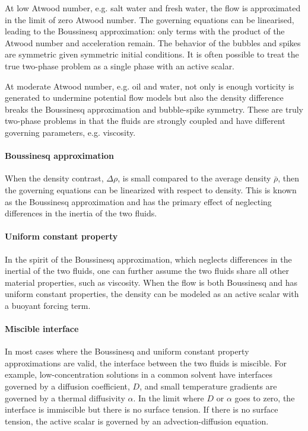 At low Atwood number, e.g. salt water and fresh water, the flow is approximated in the limit of zero Atwood number.
The governing equations can be linearised, leading to the Boussinesq approximation: only terms with the product of the Atwood number and acceleration remain.
The behavior of the bubbles and spikes are symmetric given symmetric initial conditions.
It is often possible to treat the true two-phase problem as a single phase with an active scalar.

At moderate Atwood number, e.g. oil and water, not only is enough vorticity is generated to undermine potential flow models but also the density difference breaks the Boussinesq approximation and bubble-spike symmetry.
These are truly two-phase problems in that the fluids are strongly coupled and have different governing parameters, e.g. viscosity.

\paragraph{Boussinesq approximation}
When the density contrast, $\Delta \rho$, is small compared to the average density $\bar{\rho}$, then 
the governing equations can be linearized with respect to density.
This is known as the Boussinesq approximation and has the primary effect of neglecting differences in the inertia of the two fluids.

\paragraph{Uniform constant property}
In the spirit of the Boussinesq approximation, which neglects differences in the inertial of the two fluids, one can further assume the two fluids share all other material properties, such as viscosity.
When the flow is both Boussinesq and has uniform constant properties, the density can be modeled as an active scalar with a buoyant forcing term.

\paragraph{Miscible interface}
In most cases where the Boussinesq and uniform constant property approximations are valid, the interface between the two fluids is miscible.
For example, low-concentration solutions in a common solvent have interfaces governed by a diffusion coefficient, $D$, and small temperature gradients are governed by a thermal diffusivity $\alpha$.
In the limit where $D$ or $\alpha$ goes to zero, the interface is immiscible but there is no surface tension.
If there is no surface tension, the active scalar is governed by an advection-diffusion equation.

